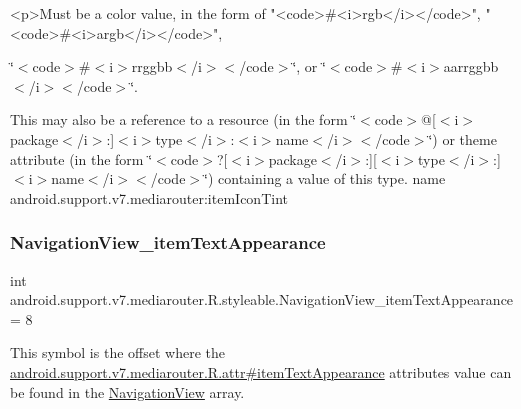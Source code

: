 \begin{DoxyVerb}      <p>Must be a color value, in the form of "<code>#<i>rgb</i></code>", "<code>#<i>argb</i></code>",
\end{DoxyVerb}
 \char`\"{}$<$code$>$\#$<$i$>$rrggbb$<$/i$>$$<$/code$>$\char`\"{}, or \char`\"{}$<$code$>$\#$<$i$>$aarrggbb$<$/i$>$$<$/code$>$\char`\"{}. 

This may also be a reference to a resource (in the form \char`\"{}$<$code$>$@\mbox{[}$<$i$>$package$<$/i$>$\+:\mbox{]}$<$i$>$type$<$/i$>$\+:$<$i$>$name$<$/i$>$$<$/code$>$\char`\"{}) or theme attribute (in the form \char`\"{}$<$code$>$?\mbox{[}$<$i$>$package$<$/i$>$\+:\mbox{]}\mbox{[}$<$i$>$type$<$/i$>$\+:\mbox{]}$<$i$>$name$<$/i$>$$<$/code$>$\char`\"{}) containing a value of this type.  name android.\+support.\+v7.\+mediarouter\+:item\+Icon\+Tint \mbox{\label{classandroid_1_1support_1_1v7_1_1mediarouter_1_1R_1_1styleable_a1544b6d2a4ba48eb068d259a34bb4b3b}} 
\subsubsection{\texorpdfstring{Navigation\+View\+\_\+item\+Text\+Appearance}{NavigationView\_itemTextAppearance}}
{\footnotesize\ttfamily int android.\+support.\+v7.\+mediarouter.\+R.\+styleable.\+Navigation\+View\+\_\+item\+Text\+Appearance = 8\hspace{0.3cm}{\ttfamily [static]}}

This symbol is the offset where the \hyperlink{classandroid_1_1support_1_1v7_1_1mediarouter_1_1R_1_1attr_a57b6a8878a26dcbd7f69a1615dc2a32b}{android.\+support.\+v7.\+mediarouter.\+R.\+attr\#item\+Text\+Appearance} attribute\textquotesingle{}s value can be found in the \hyperlink{classandroid_1_1support_1_1v7_1_1mediarouter_1_1R_1_1styleable_a9216c77e145f14d4fdd264c2381fce44}{Navigation\+View} array.


